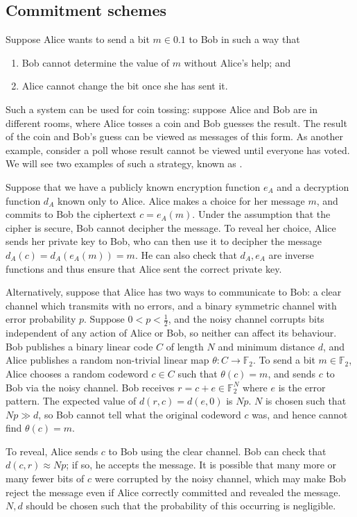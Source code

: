 \subsection{Commitment schemes}
Suppose Alice wants to send a bit $m \in \qty{0,1}$ to Bob in such a way that
\begin{enumerate}
    \item Bob cannot determine the value of $m$ without Alice's help; and
    \item Alice cannot change the bit once she has sent it.
\end{enumerate}
Such a system can be used for coin tossing: suppose Alice and Bob are in different rooms, where Alice tosses a coin and Bob guesses the result.
The result of the coin and Bob's guess can be viewed as messages of this form.
As another example, consider a poll whose result cannot be viewed until everyone has voted.
We will see two examples of such a  strategy, known as .

Suppose that we have a publicly known encryption function $e_A$ and a decryption function $d_A$ known only to Alice.
Alice makes a choice for her message $m$, and commits to Bob the ciphertext $c = e_A(m)$.
Under the assumption that the cipher is secure, Bob cannot decipher the message.
To reveal her choice, Alice sends her private key to Bob, who can then use it to decipher the message $d_A(c) = d_A(e_A(m)) = m$.
He can also check that $d_A, e_A$ are inverse functions and thus ensure that Alice sent the correct private key.

Alternatively, suppose that Alice has two ways to communicate to Bob: a clear channel which transmits with no errors, and a binary symmetric channel with error probability $p$.
Suppose $0 < p < \frac{1}{2}$, and the noisy channel corrupts bits independent of any action of Alice or Bob, so neither can affect its behaviour.
Bob publishes a binary linear code $C$ of length $N$ and minimum distance $d$, and Alice publishes a random non-trivial linear map $\theta \colon C \to \mathbb F_2$.
To send a bit $m \in \mathbb F_2$, Alice chooses a random codeword $c \in C$ such that $\theta(c) = m$, and sends $c$ to Bob via the noisy channel.
Bob receives $r = c + e \in \mathbb F_2^N$ where $e$ is the error pattern.
The expected value of $d(r,c) = d(e,0)$ is $Np$.
$N$ is chosen such that $Np \gg d$, so Bob cannot tell what the original codeword $c$ was, and hence cannot find $\theta(c) = m$.

To reveal, Alice sends $c$ to Bob using the clear channel.
Bob can check that $d(c,r) \approx Np$; if so, he accepts the message.
It is possible that many more or many fewer bits of $c$ were corrupted by the noisy channel, which may make Bob reject the message even if Alice correctly committed and revealed the message.
$N, d$ should be chosen such that the probability of this occurring is negligible.

